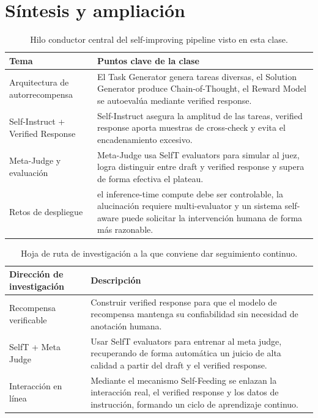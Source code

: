 \section{Síntesis y ampliación}
\begin{table}[H]
\centering
\begin{tabular}{p{4.5cm}p{11cm}}
\toprule
Tema & Puntos clave de la clase \\
\midrule
Arquitectura de autorrecompensa & El Task Generator genera tareas diversas, el Solution Generator produce Chain-of-Thought, el Reward Model se autoevalúa mediante verified response. \\
Self-Instruct + Verified Response & Self-Instruct asegura la amplitud de las tareas, verified response aporta muestras de cross-check y evita el encadenamiento excesivo. \\
Meta-Judge y evaluación & Meta-Judge usa SelfT evaluators para simular al juez, logra distinguir entre draft y verified response y supera de forma efectiva el plateau. \\
Retos de despliegue & el inference-time compute debe ser controlable, la alucinación requiere multi-evaluator y un sistema self-aware puede solicitar la intervención humana de forma más razonable. \\
\bottomrule
\end{tabular}
\caption{Hilo conductor central del self-improving pipeline visto en esta clase.}
\end{table}

\begin{table}[H]
\centering
\begin{tabular}{p{5cm}p{10cm}}
\toprule
Dirección de investigación & Descripción \\
\midrule
Recompensa verificable & Construir verified response para que el modelo de recompensa mantenga su confiabilidad sin necesidad de anotación humana. \\
SelfT + Meta Judge & Usar SelfT evaluators para entrenar al meta judge, recuperando de forma automática un juicio de alta calidad a partir del draft y el verified response. \\
Interacción en línea & Mediante el mecanismo Self-Feeding se enlazan la interacción real, el verified response y los datos de instrucción, formando un ciclo de aprendizaje continuo. \\
\bottomrule
\end{tabular}
\caption{Hoja de ruta de investigación a la que conviene dar seguimiento continuo.}
\end{table}

